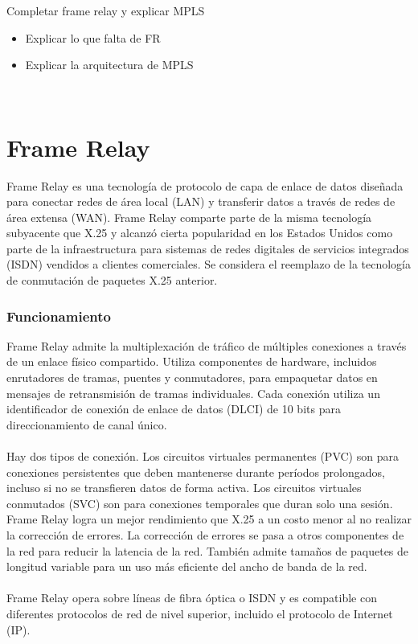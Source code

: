 {\color{red}\noindent 
Completar frame relay y explicar MPLS
\begin{itemize}
\item Explicar lo que falta de FR
\item Explicar la arquitectura de MPLS
\end{itemize}
}\\

\section*{Frame Relay}
Frame Relay es una tecnología de protocolo de capa de enlace de datos diseñada para conectar redes de área local (LAN) y transferir datos a través de redes de área extensa (WAN). Frame Relay comparte parte de la misma tecnología subyacente que X.25 y alcanzó cierta popularidad en los Estados Unidos como parte de la infraestructura para sistemas de redes digitales de servicios integrados (ISDN) vendidos a clientes comerciales. Se considera el reemplazo de la tecnología de conmutación de paquetes X.25 anterior.
\subsubsection*{Funcionamiento}

Frame Relay admite la multiplexación de tráfico de múltiples conexiones a través de un enlace físico compartido. Utiliza componentes de hardware, incluidos enrutadores de tramas, puentes y conmutadores, para empaquetar datos en mensajes de retransmisión de tramas individuales. Cada conexión utiliza un identificador de conexión de enlace de datos (DLCI) de 10 bits para direccionamiento de canal único. \\{ }\\
Hay dos tipos de conexión. Los circuitos virtuales permanentes (PVC) son para conexiones persistentes que deben mantenerse durante períodos prolongados, incluso si no se transfieren datos de forma activa. Los circuitos virtuales conmutados (SVC) son para conexiones temporales que duran solo una sesión. Frame Relay logra un mejor rendimiento que X.25 a un costo menor al no realizar la corrección de errores. La corrección de errores se pasa  a otros componentes de la red para reducir la latencia de la red. También admite tamaños de paquetes de longitud variable para un uso más eficiente del ancho de banda de la red.\\{ }\\
Frame Relay opera sobre líneas de fibra óptica o ISDN y es compatible con diferentes protocolos de red de nivel superior, incluido el protocolo de Internet (IP).

